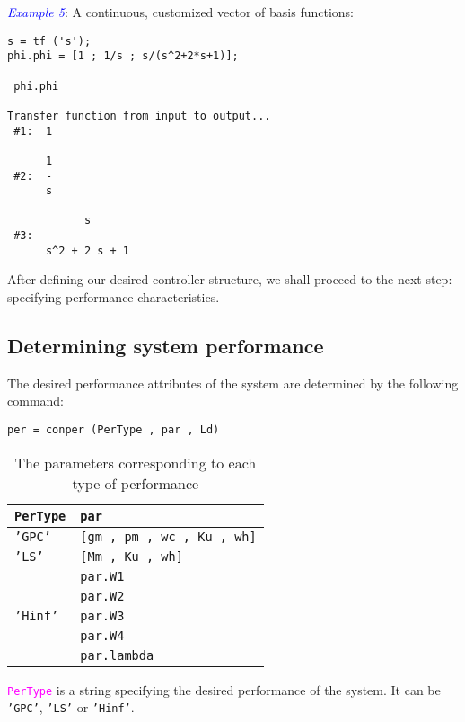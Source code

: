 \documentclass [12pt , a4paper] {article}
\begin{document}
\textcolor{blue}{\emph{Example 5}}: A continuous, customized vector of basis functions:

\begin{lstlisting}
s = tf ('s');
phi.phi = [1 ; 1/s ; s/(s^2+2*s+1)];

 phi.phi
 
Transfer function from input to output...
 #1:  1
 
      1
 #2:  -
      s
 
            s
 #3:  -------------
      s^2 + 2 s + 1
\end{lstlisting}

After defining our desired controller structure, we shall proceed to the next step: specifying performance characteristics.

\subsection{Determining system performance}
The desired performance attributes of the system are determined by the following command:
\begin{lstlisting}
per = conper (PerType , par , Ld) 
\end{lstlisting}
\begin{table}
  \centering 
  \caption{The parameters corresponding to each type of performance} \smallskip \smallskip
  \begin{tabularx}{0.8\textwidth}{X X}
\hline \hline \noalign{\smallskip} \noalign{\smallskip} 
  \texttt{PerType} & \texttt{par}  \\ [0.3 cm] \hline \hline \noalign{\smallskip} \noalign{\smallskip} \noalign{\smallskip} 
   \texttt{'GPC'}& \texttt{[gm , pm , wc , Ku , wh]}  \\ [.5 cm]
   \texttt{'LS'}& \texttt{[Mm , Ku , wh]}  \\ [0.5 cm]
   \multirow{5}{*}{\texttt{'Hinf'}} & \texttt{par.W1} \\
   & \texttt{par.W2}\\
   & \texttt{par.W3}\\
   & \texttt{par.W4}\\
   & \texttt{par.lambda} \\ [.3 cm]
\hline \hline
\end{tabularx}
  \label{tab:second command}
\end{table}
\textcolor{magenta}{\texttt{PerType}} is a string specifying the desired performance of the system. It can be \texttt{'GPC'}, \texttt{'LS'} or \texttt{'Hinf'}. 
\end{document}
